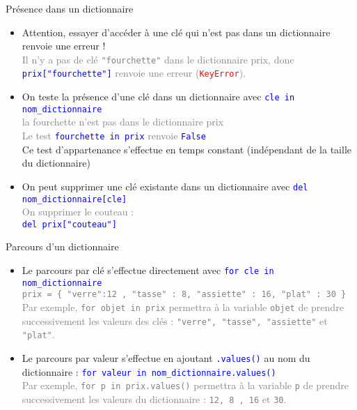 \documentclass[10pt]{beamer}
\begin{document}
\begin{frame}{\Ctitle}{\stitle}
	\begin{block}{Présence dans un dictionnaire}
		\begin{itemize}
			\item<1-> Attention, essayer d'accéder à une clé qui n'est pas dans un dictionnaire renvoie une erreur !\\
				\onslide<2->\textcolor{gray}{\footnotesize Il n'y a pas de clé {\tt "fourchette"} dans le dictionnaire prix, donc \textcolor{blue}{\tt prix["fourchette"]} renvoie une erreur ({\tt \textcolor{red}{KeyError}}).}
			\item<3-> On teste la présence d'une clé dans un dictionnaire avec \textcolor{blue}{\tt cle in nom\_dictionnaire}\\
				\onslide<4->\textcolor{gray}{\footnotesize la fourchette n'est pas dans le dictionnaire prix \\
					Le test \textcolor{blue}{\tt fourchette in prix} renvoie \textcolor{blue}{\tt False}\\}
				\onslide<5->\textcolor{BrickRed}{\footnotesize \important} \textcolor{BrickRed}{Ce test d'appartenance s'effectue en temps constant (indépendant de la taille du dictionnaire)}
			\item<6-> On peut supprimer une clé existante dans un dictionnaire avec \textcolor{blue}{\tt del nom\_dictionnaire[cle]}\\
				\onslide<7->\textcolor{gray}{\footnotesize On supprimer le couteau : \\
					\textcolor{blue}{\tt del prix["couteau"]}
				}
		\end{itemize}
	\end{block}
\end{frame}


\begin{frame}{\Ctitle}{\stitle}
	\begin{alertblock}{Parcours d'un dictionnaire}
		\begin{itemize}
			\item<1-> Le parcours par clé s'effectue directement avec \textcolor{blue}{\tt for cle in nom\_dictionnaire}\\
				\onslide<2->\textcolor{gray}{{\footnotesize \tt prix = \{ "verre":12 , "tasse" : 8, "assiette" : 16, "plat" : 30 \} } \\
				{\footnotesize Par exemple, {\tt for objet in prix} permettra à la variable {\tt objet} de prendre successivement les valeurs des clés : {\tt "verre", "tasse", "assiette"} et {\tt "plat"}.}}
			\item<3-> Le parcours par valeur s'effectue en ajoutant \textcolor{blue}{\tt .values()} au nom du dictionnaire : \textcolor{blue}{\tt for valeur in nom\_dictionnaire.values() \\}
				\onslide<4->\textcolor{gray}{\footnotesize
				Par exemple, {\tt for p in prix.values()} permettra à la variable {\tt p} de prendre successivement les valeurs du dictionnaire : {\tt 12, 8 , 16} et {\tt 30}.
				}
		\end{itemize}
	\end{alertblock}
\end{frame}
\end{document}
